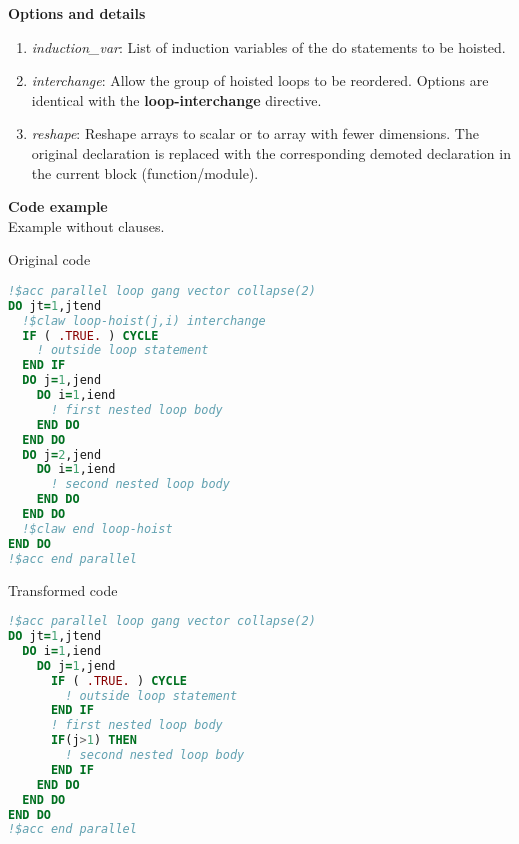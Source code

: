 \textbf{Options and details}
\begin{enumerate}
\item \textit{induction\_var}: List of induction variables of the do statements to be hoisted.
\item \textit{interchange}: Allow the group of hoisted loops to be reordered.
Options are identical with the \textbf{loop-interchange} directive.
\item \textit{reshape}: Reshape arrays to scalar or to array with fewer dimensions. The original declaration is replaced with the corresponding demoted declaration in the current block (function/module).
\end{enumerate}

\textbf{Code example}\\
\label{loop-hoist1}
Example without clauses.

Original code
\begin{lstlisting}[language=Fortran]
!$acc parallel loop gang vector collapse(2)
DO jt=1,jtend
  !$claw loop-hoist(j,i) interchange
  IF ( .TRUE. ) CYCLE
    ! outside loop statement
  END IF
  DO j=1,jend
    DO i=1,iend
      ! first nested loop body
    END DO
  END DO
  DO j=2,jend
    DO i=1,iend
      ! second nested loop body
    END DO
  END DO
  !$claw end loop-hoist
END DO
!$acc end parallel
\end{lstlisting}


Transformed code
\begin{lstlisting}[language=Fortran]
!$acc parallel loop gang vector collapse(2)
DO jt=1,jtend
  DO i=1,iend
    DO j=1,jend
      IF ( .TRUE. ) CYCLE
        ! outside loop statement
      END IF
      ! first nested loop body
      IF(j>1) THEN
        ! second nested loop body
      END IF
    END DO
  END DO
END DO
!$acc end parallel
\end{lstlisting}
